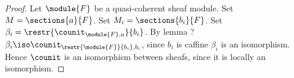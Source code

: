 
\begin{proof}
Let $\module{F}$ be a quasi-coherent sheaf module. 
Set $M = \sections{a}{F}$.
Set $M_i = \sections{b_i}{F}$.
Set $\beta_i = \restr{\counit_{\module{F},a}}{b_i}$.
By lemma ? $\beta_i \iso \counit_{\restr{\module{F}}{b_i},b_i}$, 
since $b_i$ is caffine $\beta_i$ is an isomorphism.
Hence $\counit$ is an isomorphism between sheafs, since it is locally an isomorphism.
\end{proof}
